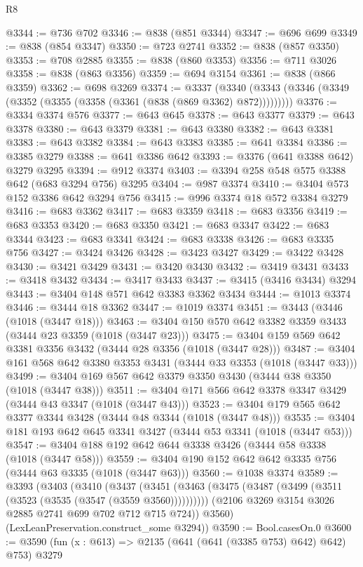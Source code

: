 \begin{lexlean}{R8}
\begin{coremodule}
@3344 := @736 @702
@3346 := @838 (@851 @3344)
@3347 := @696 @699
@3349 := @838 (@854 @3347)
@3350 := @723 @2741
@3352 := @838 (@857 @3350)
@3353 := @708 @2885
@3355 := @838 (@860 @3353)
@3356 := @711 @3026
@3358 := @838 (@863 @3356)
@3359 := @694 @3154
@3361 := @838 (@866 @3359)
@3362 := @698 @3269
@3374 := @3337
    (@3340 (@3343 (@3346 (@3349 (@3352 (@3355 (@3358 (@3361 (@838 (@869 @3362) @872)))))))))
@3376 := @3334 @3374 @576
@3377 := @643 @645
@3378 := @643 @3377
@3379 := @643 @3378
@3380 := @643 @3379
@3381 := @643 @3380
@3382 := @643 @3381
@3383 := @643 @3382
@3384 := @643 @3383
@3385 := @641 @3384
@3386 := @3385 @3279
@3388 := @641 @3386 @642
@3393 := @3376 (@641 @3388 @642) @3279 @3295
@3394 := @912 @3374
@3403 := @3394 @258 @548 @575 @3388 @642 (@683 @3294 @756) @3295
@3404 := @987 @3374
@3410 := @3404 @573 @152 @3386 @642 @3294 @756
@3415 := @996 @3374 @18 @572 @3384 @3279
@3416 := @683 @3362
@3417 := @683 @3359
@3418 := @683 @3356
@3419 := @683 @3353
@3420 := @683 @3350
@3421 := @683 @3347
@3422 := @683 @3344
@3423 := @683 @3341
@3424 := @683 @3338
@3426 := @683 @3335 @756
@3427 := @3424 @3426
@3428 := @3423 @3427
@3429 := @3422 @3428
@3430 := @3421 @3429
@3431 := @3420 @3430
@3432 := @3419 @3431
@3433 := @3418 @3432
@3434 := @3417 @3433
@3437 := @3415 (@3416 @3434) @3294
@3443 := @3404 @148 @571 @642 @3383 @3362 @3434
@3444 := @1013 @3374
@3446 := @3444 @18 @3362
@3447 := @1019 @3374
@3451 := @3443 (@3446 (@1018 (@3447 @18)))
@3463 := @3404 @150 @570 @642 @3382 @3359 @3433 (@3444 @23 @3359 (@1018 (@3447 @23)))
@3475 := @3404 @159 @569 @642 @3381 @3356 @3432 (@3444 @28 @3356 (@1018 (@3447 @28)))
@3487 := @3404 @161 @568 @642 @3380 @3353 @3431 (@3444 @33 @3353 (@1018 (@3447 @33)))
@3499 := @3404 @169 @567 @642 @3379 @3350 @3430 (@3444 @38 @3350 (@1018 (@3447 @38)))
@3511 := @3404 @171 @566 @642 @3378 @3347 @3429 (@3444 @43 @3347 (@1018 (@3447 @43)))
@3523 := @3404 @179 @565 @642 @3377 @3344 @3428 (@3444 @48 @3344 (@1018 (@3447 @48)))
@3535 := @3404 @181 @193 @642 @645 @3341 @3427 (@3444 @53 @3341 (@1018 (@3447 @53)))
@3547 := @3404 @188 @192 @642 @644 @3338 @3426 (@3444 @58 @3338 (@1018 (@3447 @58)))
@3559 := @3404 @190 @152 @642 @642 @3335 @756 (@3444 @63 @3335 (@1018 (@3447 @63)))
@3560 := @1038 @3374
@3589 := @3393
    (@3403
      (@3410
        (@3437
          (@3451 (@3463 (@3475 (@3487 (@3499 (@3511 (@3523 (@3535 (@3547 (@3559 @3560))))))))))
          (@2106 @3269 @3154 @3026 @2885 @2741 @699 @702 @712 @715 @724))
        @3560)
      (LexLeanPreservation.construct_some @3294))
@3590 := Bool.casesOn.{0}
@3600 := @3590 (fun (x : @613) => @2135 (@641 (@641 (@3385 @753) @642) @642) @753) @3279

\end{coremodule}
\end{lexlean}
